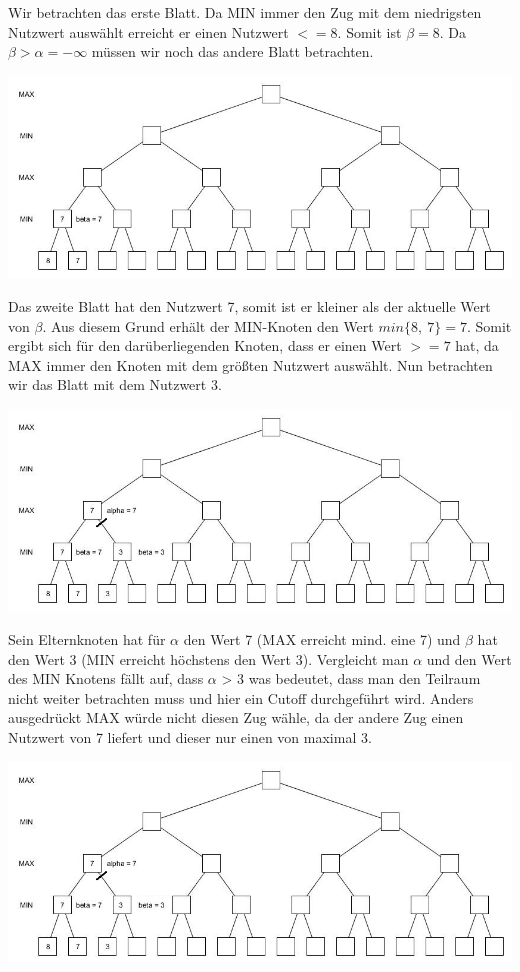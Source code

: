Wir betrachten das erste Blatt. Da MIN immer den Zug mit dem niedrigsten Nutzwert auswählt erreicht er einen Nutzwert $<=8$. Somit ist $\beta = 8$. Da $\beta > \alpha = -\infty$ müssen wir noch das andere Blatt betrachten.

\begin{center}
	\includegraphics[width = 12 cm]{chapters/minimax/jpg/Alpha-beta2.jpg}
\end{center}

Das zweite Blatt hat den Nutzwert 7, somit ist er kleiner als der aktuelle Wert von $\beta$. Aus diesem Grund erhält der MIN-Knoten den Wert $min\{8,~7\} =7$. Somit ergibt sich für den darüberliegenden Knoten, dass er einen Wert $>=7$ hat, da MAX immer den Knoten mit dem größten Nutzwert auswählt. Nun betrachten wir das Blatt mit dem Nutzwert 3.

\begin{center}
	\includegraphics[width = 12 cm]{chapters/minimax/jpg/Alpha-beta3.jpg}
\end{center}

Sein Elternknoten hat für $\alpha$ den Wert 7 (MAX erreicht mind. eine 7) und $\beta$ hat den Wert 3 (MIN erreicht höchstens den Wert 3). Vergleicht man $\alpha$ und den Wert des MIN Knotens fällt auf, dass $\alpha$ > 3 was bedeutet, dass man den Teilraum nicht weiter betrachten muss und hier ein Cutoff durchgeführt wird. Anders ausgedrückt MAX würde nicht diesen Zug wähle, da der andere Zug einen Nutzwert von 7 liefert und dieser nur einen von maximal 3.

\begin{center}
	\includegraphics[width = 12 cm]{chapters/minimax/jpg/Alpha-beta3-1.jpg}
\end{center}

